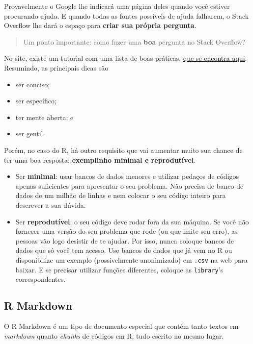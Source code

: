 \documentclass[
]{book}
\providecommand{\tightlist}{%
  \setlength{\itemsep}{0pt}\setlength{\parskip}{0pt}}
\begin{document}
Provavelmente o Google lhe indicará uma página deles quando você estiver procurando ajuda. E quando todas as fontes possíveis de ajuda falharem, o Stack Overflow lhe dará o espaço para \textbf{criar sua própria pergunta}.

\begin{quote}
Um ponto importante: como fazer uma \textbf{boa} pergunta no Stack Overflow?
\end{quote}

No site, existe um tutorial com uma lista de boas práticas, \href{http://pt.stackoverflow.com/help/how-to-ask}{que se encontra aqui}. Resumindo, as principais dicas são

\begin{itemize}
\tightlist
\item
  ser conciso;
\item
  ser específico;
\item
  ter mente aberta; e
\item
  ser gentil.
\end{itemize}

Porém, no caso do R, há outro requisito que vai aumentar muito sua chance de ter uma boa resposta: \textbf{exemplinho minimal e reprodutível}.

\begin{itemize}
\item
  Ser \textbf{minimal}: usar bancos de dados menores e utilizar pedaços de códigos apenas suficientes para apresentar o seu problema. Não precisa de banco de dados de um milhão de linhas e nem colocar o seu código inteiro para descrever a sua dúvida.
\item
  Ser \textbf{reprodutível}: o seu código deve rodar fora da sua máquina. Se você não fornecer uma versão do seu problema que rode (ou que imite seu erro), as pessoas vão logo desistir de te ajudar. Por isso, nunca coloque bancos de dados que só você tem acesso. Use bancos de dados que já vem no R ou disponibilize um exemplo (possivelmente anonimizado) em \texttt{.csv} na web para baixar. E se precisar utilizar funções diferentes, coloque as \texttt{library}'s correspondentes.
\end{itemize}

\hypertarget{r-markdown}{%
\subsection{R Markdown}\label{r-markdown}}

O R Markdown é um tipo de documento especial que contém tanto textos em \emph{markdown} quanto \emph{chunks} de códigos em R, tudo escrito no mesmo lugar.
\end{document}
